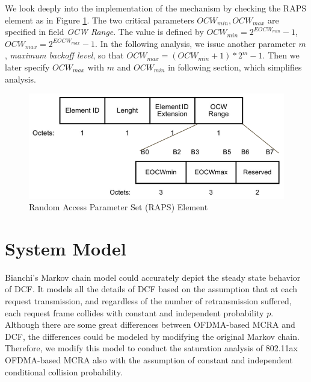 \documentclass[journal]{IEEEtran}
\begin{document}
We look deeply into the implementation of the mechanism by checking the RAPS element as in Figure \ref{fig_RAPS}.
The two critical parameters $OCW_{min},OCW_{max}$ are specified in field \textit{OCW Range}. 
The value is defined by $OCW_{min} = 2^{EOCW_{min}}-1$, $OCW_{max} = 2^{EOCW_{max}}-1$. 
In the following analysis, we issue another parameter $m$, \textit{maximum backoff level}, so that $OCW_{max} = (OCW_{min}+1)*2^m-1$. 
Then we later specify $OCW_{max}$ with $m$ and $OCW_{min}$ in following section, which simplifies analysis.





\begin{figure}[!h]
\includegraphics[scale=0.3]{./figure/RAPS.png}
\caption{Random Access Parameter Set (RAPS) Element}
\label{fig_RAPS}
\end{figure}



\section{System Model} 		\label{sec_sys_model}
Bianchi's Markov chain model could accurately depict the steady state behavior of DCF. 
It models all the details of DCF based on the assumption that at each request transmission, and regardless of the number of retransmission suffered, each request frame collides with constant and independent probability $p$. 
Although there are some great differences between OFDMA-based MCRA and DCF, the differences could be modeled by modifying the original Markov chain.
Therefore, we modify this model to conduct the saturation analysis of 802.11ax OFDMA-based MCRA also with the assumption of constant and independent conditional collision probability.
\end{document}
